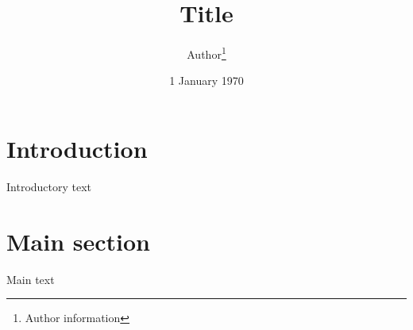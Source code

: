 \documentclass[11pt, a4paper, british]{article}
\begin{document}
	\title{Title}
	\author{Author\thanks{Author information}}
	\date{1 January 1970}


	\maketitle

	\section{Introduction}

		Introductory text

	\section{Main section}

		Main text
\end{document}
